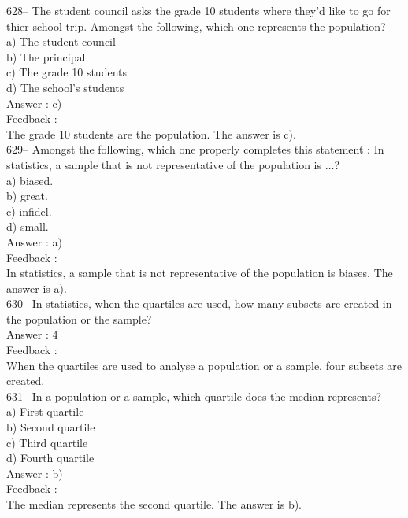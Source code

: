 \documentclass[letterpaper, 12pt]{article}
\begin{document}
628-- The student council asks the grade 10 students where they'd like to go for thier school trip.  Amongst the following, which one represents the population?\\
a) The student council\\
b) The principal\\
c) The grade 10 students\\
d) The school's students\\

Answer : c)\\

Feedback : \\
The grade 10 students are the population. The answer is c).\\

629-- Amongst the following, which one properly completes this statement : \og In statistics, a sample that is not representative of the population is $\ldots$\fg ?\\
a) biased.\\
b) great.\\
c) infidel.\\
d) small.\\

Answer : a)\\

Feedback : \\
In statistics, a sample that is not representative of the population is biases.  The answer is a).\\

630-- In statistics, when the quartiles are used, how many subsets are created in the population or the sample?\\

Answer : 4\\

Feedback : \\
When the quartiles are used to analyse a population or a sample, four subsets are created.\\

631-- In a population or a sample, which quartile does the median represents?\\
a) First quartile\\
b) Second quartile\\
c) Third quartile\\
d) Fourth quartile\\

Answer : b)\\

Feedback : \\
The median represents the second quartile.  The answer is b).\\
\end{document}
